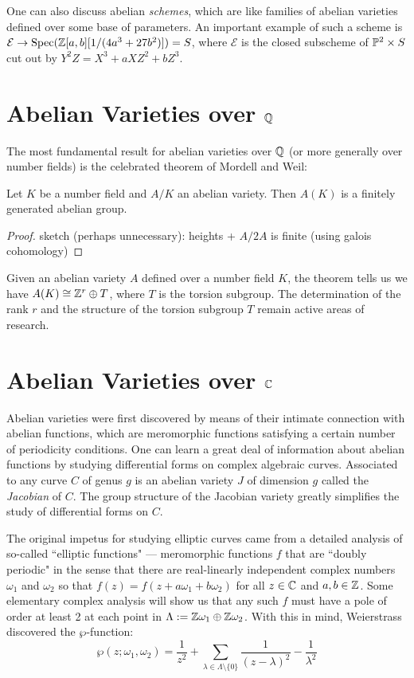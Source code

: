 One can also discuss abelian \emph{schemes}, which are like families of abelian varieties defined over some base of parameters. An important example of such a scheme is  $\mathcal{E}\rightarrow \operatorname{Spec}(\mathbb{Z}[a,b][1/(4a^3+27b^2)])=S$, where $\mathcal{E}$ is the closed subscheme of $\mathbb{P}^2\times S$ cut out by $Y^2Z=X^3+aXZ^2+bZ^3$.

\section{Abelian Varieties over $\mathbb{Q}$}
The most fundamental result for abelian varieties over $\mathbb{Q}$ (or more generally over number fields) is the celebrated theorem of Mordell and Weil:
\begin{theorem}
\label{mordell-weil}
Let $K$ be a number field and $A/K$ an abelian variety. Then $A(K)$ is a finitely generated abelian group.
\end{theorem}
\begin{proof}
sketch (perhaps unnecessary): heights + $A/2A$ is finite (using galois cohomology)
\end{proof}

Given an abelian variety $A$ defined over a number field $K$, the theorem tells us we have $A(K)\cong \mathbb{Z}^r \oplus T$, where $T$ is the torsion subgroup. The determination of the rank $r$ and the structure of the torsion subgroup $T$ remain active areas of research.

\section{Abelian Varieties over $\mathbb{C}$}

Abelian varieties were first discovered by means of their intimate connection with abelian functions, which are meromorphic functions satisfying a certain number of periodicity conditions. One can learn a great deal of information about abelian functions by studying differential forms on complex algebraic curves. Associated to any curve $C$ of genus $g$ is an abelian variety $J$ of dimension $g$ called the \emph{Jacobian} of $C$. The group structure of the Jacobian variety greatly simplifies the study of differential forms on $C$.

The original impetus for studying elliptic curves came from a detailed analysis of so-called ``elliptic functions" --- meromorphic functions $f$ that are ``doubly periodic" in the sense that there are real-linearly independent complex numbers $\omega_1$ and $\omega_2$ so that $f(z)=f(z+a\omega_1+b\omega_2)$ for all $z\in \mathbb{C}$ and $a,b\in\mathbb{Z}$. Some elementary complex analysis will show us that any such $f$ must have a pole of order at least 2 at each point in $\Lambda:=\mathbb{Z}\omega_1\oplus \mathbb{Z}\omega_2$. With this in mind, Weierstrass discovered the $\wp$-function: $$\wp(z;\omega_1,\omega_2) = \frac{1}{z^2} + \sum\limits_{\lambda\in\Lambda\setminus\{0\}} \frac{1}{(z-\lambda)^2}-\frac{1}{\lambda^2}$$

